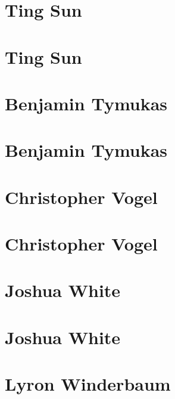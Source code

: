 \documentclass[twoside,14pt,a4paper,notitlepage]{memoir}
\begin{document}
\section*{Ting Sun}
\label{aut:sun}

\lipsum[1-2]
\section*{Ting Sun}
\lipsum[3]



\section*{Benjamin Tymukas}
\label{aut:tymukas}

\lipsum[1-2]
\section*{Benjamin Tymukas}
\lipsum[3]



\section*{Christopher Vogel}
\label{aut:vogel}

\lipsum[1-2]
\section*{Christopher Vogel}
\lipsum[3]



\section*{Joshua White}
\label{aut:white}

\lipsum[1-2]
\section*{Joshua White}
\lipsum[3]



\section*{Lyron Winderbaum}
\label{aut:winderbaum}
\end{document}
